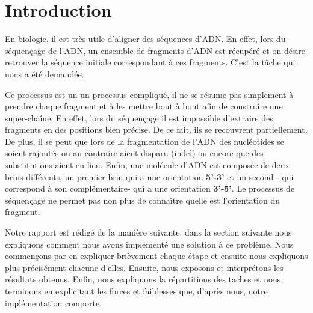 
\section{Introduction}

En biologie, il est très utile d'aligner des séquences d'ADN. En effet, lors du séquençage de l'ADN, un ensemble de fragments d'ADN  est récupéré et on désire retrouver la séquence initiale correspondant à ces fragments. C'est la tâche qui nous a été demandée. 

Ce processus est un un processus compliqué, il ne se résume pas simplement à prendre chaque fragment et à les mettre bout à bout afin de construire une super-chaîne. En effet,
lors du séquençage il est impossible d'extraire des fragments en des positions bien précise. De ce fait, ils se recouvrent partiellement. De plus, il se peut que lors de la fragmentation de l'ADN des nucléotides se soient rajoutés ou au contraire aient disparu (indel) ou encore que des substitutions aient eu lieu. Enfin, une molécule d'ADN est composée de deux brins différents, un premier brin qui a une orientation \textbf{5'-3'} et un second - qui correspond à son complémentaire- qui a une orientation \textbf{3'-5'}. Le processus de séquençage ne permet pas non plus de connaître quelle est l'orientation du fragment.

Notre rapport est rédigé de la manière suivante: dans la section suivante nous expliquons comment nous avons implémenté une solution à ce problème. Nous commençons par en expliquer brièvement chaque étape et ensuite nous expliquons plus précisément chacune d'elles. Ensuite, nous exposons et interprétons les résultats obtenus. Enfin, nous expliquons la répartitions des taches et nous terminons en  explicitant les forces et faiblesses que, d'après nous, notre implémentation comporte.

